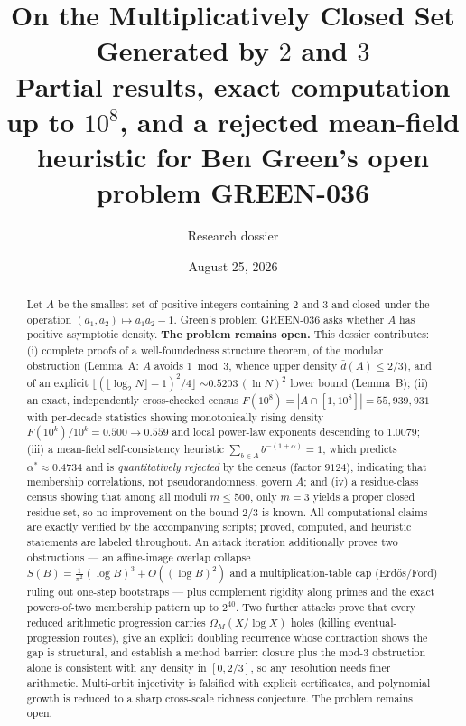 \documentclass[11pt]{article}
\title{On the Multiplicatively Closed Set Generated by $2$ and $3$\\
\large Partial results, exact computation up to $10^8$, and a rejected
mean-field heuristic for Ben Green's open problem GREEN-036}
\author{Research dossier}
\date{August 25, 2026}
\theoremstyle{definition}
\newcommand{\A}{A}
\newcommand{\F}{F}
\begin{document}
\maketitle

\begin{abstract}
Let $\A$ be the smallest set of positive integers containing $2$ and $3$ and
closed under the operation $(a_1,a_2)\mapsto a_1a_2-1$. Green's problem
GREEN-036 asks whether $\A$ has positive asymptotic density.
\textbf{The problem remains open.} This dossier contributes: (i) complete
proofs of a well-foundedness structure theorem, of the modular obstruction
(Lemma~A: $\A$ avoids $1 \bmod 3$, whence upper density $\bar d(\A)\le 2/3$),
and of an explicit $\lfloor(\lfloor\log_2 N\rfloor-1)^2/4\rfloor$
$\sim 0.5203\,(\ln N)^2$ lower bound (Lemma~B); (ii) an exact, independently
cross-checked census $\F(10^8)=|\A\cap[1,10^8]|=55{,}939{,}931$ with per-decade
statistics showing monotonically rising density
$F(10^k)/10^k = 0.500\to0.559$ and local power-law exponents descending to
$1.0079$; (iii) a mean-field self-consistency heuristic
$\sum_{b\in\A} b^{-(1+\alpha)}=1$, which predicts $\alpha^\ast\approx0.4734$
and is \emph{quantitatively rejected} by the census (factor $9124$), indicating
that membership correlations, not pseudorandomness, govern $\A$; and (iv) a
residue-class census showing that among all moduli $m\le500$, only $m=3$
yields a proper closed residue set, so no improvement on the bound $2/3$ is
known. All computational claims are exactly verified by the accompanying
scripts; proved, computed, and heuristic statements are labeled throughout.
An attack iteration additionally proves two obstructions --- an affine-image
overlap collapse $S(B)=\frac{1}{\pi^2}(\log B)^3+O((\log B)^2)$ and a
multiplication-table cap (Erd\H{o}s/Ford) ruling out one-step bootstraps ---
plus complement rigidity along primes and the exact powers-of-two membership
pattern up to $2^{40}$. Two further attacks prove that every reduced
arithmetic progression carries $\Omega_M(X/\log X)$ holes (killing
eventual-progression routes), give an explicit doubling recurrence whose
contraction shows the gap is structural, and establish a method barrier:
closure plus the mod-3 obstruction alone is consistent with any density in
$[0,2/3]$, so any resolution needs finer arithmetic. Multi-orbit injectivity
is falsified with explicit certificates, and polynomial growth is reduced to
a sharp cross-scale richness conjecture. The problem remains open.
\end{abstract}
\end{document}
